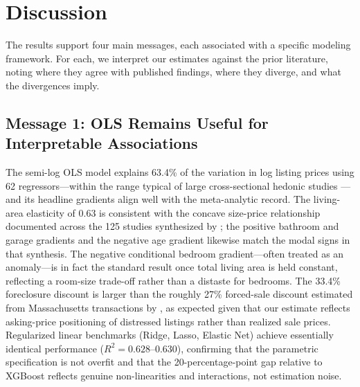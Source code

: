 %
\section{Discussion}
\label{sec:discussion}

The results support four main messages, each associated with a specific modeling
framework. For each, we interpret our estimates against the prior literature,
noting where they agree with published findings, where they diverge, and what the
divergences imply.

\subsection{Message 1: OLS Remains Useful for Interpretable Associations}

The semi-log OLS model explains 63.4\% of the variation in log listing prices
using 62 regressors---within the range typical of large cross-sectional hedonic
studies \citep{sirmans2005composition, malpezzi2003hedonic}---and its headline
gradients align well with the meta-analytic record. The living-area elasticity of
0.63 is consistent with the concave size-price relationship documented across the
125 studies synthesized by \citet{sirmans2005composition}; the positive bathroom
and garage gradients and the negative age gradient likewise match the modal signs
in that synthesis. The negative conditional bedroom gradient---often treated as an
anomaly---is in fact the standard result once total living area is held constant,
reflecting a room-size trade-off rather than a distaste for bedrooms. The 33.4\%
foreclosure discount is larger than the roughly 27\% forced-sale discount
estimated from Massachusetts transactions by \citet{campbell2011forced}, as
expected given that our estimate reflects asking-price positioning of distressed
listings rather than realized sale prices. Regularized
linear benchmarks (Ridge, Lasso, Elastic Net) achieve essentially identical
performance ($R^2 = 0.628$--$0.630$), confirming that the parametric specification
is not overfit and that the 20-percentage-point gap relative to XGBoost reflects
genuine non-linearities and interactions, not estimation noise.


